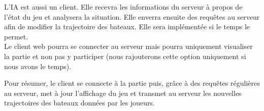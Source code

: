 L'IA est aussi un client. Elle recevra les informations du serveur à propos de l'état du jeu et analysera la situation. Elle enverra ensuite des requêtes au serveur afin de modifier la trajectoire des bateaux. Elle sera implémentée si le temps le permet.\\

Le client web pourra se connecter au serveur mais pourra uniquement visualiser la partie et non pas y participer (nous rajouterons cette option uniquement si nous avons le temps).

Pour résumer, le client se connecte à la partie puis, grâce à des requêtes régulières au serveur, met à jour l'affichage du jeu et transmet au serveur les nouvelles trajectoires des bateaux données par les joueurs.
